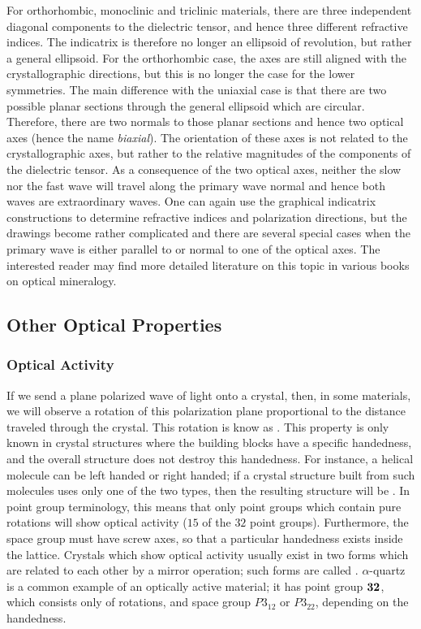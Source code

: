 For orthorhombic, monoclinic and triclinic materials, there are three independent diagonal components to the dielectric tensor,  and hence three different refractive indices.  The indicatrix is therefore no longer an ellipsoid of revolution, but rather a general ellipsoid.  For the orthorhombic case, the axes are still aligned with the crystallographic directions, but this is no longer the  case for the lower symmetries.  The main difference with the uniaxial case is that there are two possible planar sections through the  general ellipsoid which are circular.  Therefore, there are two normals to those planar sections and hence two optical axes (hence the name \textit{biaxial}).  The orientation of these axes is not related to the crystallographic axes, but rather to the relative magnitudes of the components of the dielectric tensor.  As a consequence of the two optical axes, neither the slow nor the fast wave will travel along the primary wave normal and hence both waves are extraordinary waves.  One can again use the graphical indicatrix constructions to determine refractive indices and polarization directions, but the drawings become rather complicated and there are several special cases when the primary wave is either parallel to or normal to one of the optical axes.  The interested reader may find more detailed literature on this topic in various books on optical mineralogy.

\subsection{Other Optical Properties}\label{\chabbr:sec:otheroptical}

\subsubsection{Optical Activity}

If we send a plane polarized wave of light onto a crystal, then, in some materials, we will observe a rotation of this polarization plane proportional to the distance traveled through the crystal.  This rotation is know as .  This property is only known in crystal structures where the building blocks have a specific handedness, and the overall structure does not destroy this handedness.  For instance, a helical molecule can be left handed or right handed; if a crystal structure built from such molecules uses only one of the two types, then the resulting structure will be .  In point group terminology, this means that only point groups which contain pure rotations will show optical activity ($15$ of the $32$ point groups). Furthermore, the space group must have screw axes, so that a particular handedness exists inside the lattice.  Crystals which show optical activity usually exist in two forms which are related to each other by a mirror operation; such forms are called .  $\alpha$-quartz is a common example of an optically active material; it has point group $\hm{32}$, which consists only of rotations, and space group $P3_12$ or $P3_22$, depending on the handedness.  

